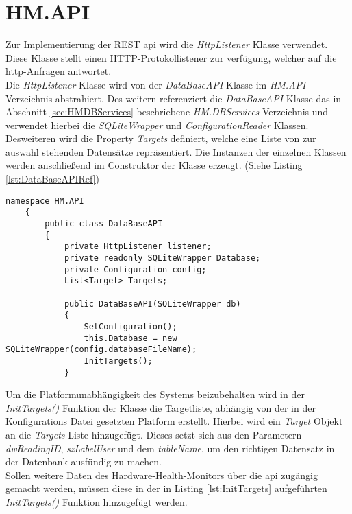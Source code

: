 \newpage
\section{HM.API}
Zur Implementierung der REST \ac{api} wird die \textit{HttpListener} Klasse verwendet. Diese Klasse stellt einen HTTP-Protokollistener zur verfügung, welcher auf die \ac{http}-Anfragen antwortet. \cite{HttpListener}\\
Die \textit{HttpListener} Klasse wird von der \textit{DataBaseAPI} Klasse im \textit{HM.API} Verzeichnis abstrahiert. Des weitern referenziert die \textit{DataBaseAPI} Klasse das in Abschnitt \ref{sec:HMDBServices} beschriebene \textit{HM.DBServices} Verzeichnis und verwendet hierbei die \textit{SQLiteWrapper} und \textit{ConfigurationReader} Klassen. Desweiteren wird die Property \textit{Targets} definiert, welche eine Liste von zur auswahl stehenden Datensätze repräsentiert. Die Instanzen der einzelnen Klassen werden anschließend im Construktor der Klasse erzeugt. (Siehe Listing \ref{lst:DataBaseAPIRef})
\begin{lstlisting}[caption={Property der DataBaseAPI Klasse}, label={lst:DataBaseAPIRef}]
    namespace HM.API
    {
        public class DataBaseAPI
        {
            private HttpListener listener;
            private readonly SQLiteWrapper Database;
            private Configuration config;
            List<Target> Targets;
            
            public DataBaseAPI(SQLiteWrapper db)
            {
                SetConfiguration();
                this.Database = new SQLiteWrapper(config.databaseFileName);
                InitTargets();
            }
\end{lstlisting}
Um die Platformunabhängigkeit des Systems beizubehalten wird in der \textit{InitTargets()} Funktion der Klasse die Targetliste, abhängig von der in der Konfigurations Datei gesetzten Platform erstellt. Hierbei wird ein \textit{Target} Objekt an die \textit{Targets} Liste hinzugefügt. Dieses setzt sich aus den Parametern \textit{dwReadingID}, \textit{szLabelUser} und dem \textit{tableName}, um den richtigen Datensatz in der Datenbank ausfündig zu machen.\\
Sollen weitere Daten des Hardware-Health-Monitors über die \ac{api} zugängig gemacht werden, müssen diese in der in Listing \ref{lst:InitTargets} aufgeführten \textit{InitTargets()} Funktion hinzugefügt werden. 
